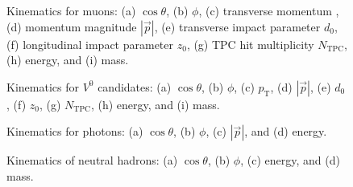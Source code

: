 \begin{figure}[p]
\centering
\vspace*{\fill}
\hfill
{}\hfill
{}
\vfill
{}\hfill
{}\hfill
{}
\vfill
{}\hfill
{}\hfill
{}
\vspace*{\fill}
\caption{Kinematics for muons: (a) $\cos\theta$, (b) $\phi$, (c) transverse momentum \pT, (d) momentum magnitude $|\vec{p}|$, (e) transverse impact parameter $d_{0}$, (f) longitudinal impact parameter $z_{0}$, (g) TPC hit multiplicity $N_{\mathrm{TPC}}$, (h) energy, and (i) mass.}
\label{fig:pwflag2_full}
\end{figure}



\begin{figure}[p]
\centering
\vspace*{\fill}
\hfill
{}\hfill
{}
\vfill
{}\hfill
{}\hfill
{}
\vfill
{}\hfill
{}\hfill
{}
\vspace*{\fill}
\caption{Kinematics for $V^{0}$ candidates: (a) $\cos\theta$, (b) $\phi$, (c) $p_{\mathrm{T}}$, (d) $|\vec{p}|$, (e) $d_{0}$, (f) $z_{0}$, (g) $N_{\mathrm{TPC}}$, (h) energy, and (i) mass.}
\label{fig:pwflag3_full}
\end{figure}


\begin{figure}[t!]
\centering
{}\hfill
{}
\vspace{0.5em}
\hfill
{}
\caption{Kinematics for photons: (a) $\cos\theta$, (b) $\phi$, (c) $|\vec{p}|$, and (d) energy.}
\label{fig:pwflag4_full}
\end{figure}


\begin{figure}[t!]
\centering
{}\hfill
{}
\vspace{0.5em}
\hfill
{}
\caption{Kinematics of neutral hadrons: (a) $\cos\theta$, (b) $\phi$, (c) energy, and (d) mass.}
\label{fig:pwflag5_full}
\end{figure}

